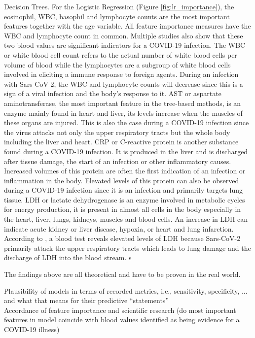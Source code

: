 Decision Trees. For the Logistic Regression (Figure \ref{fig:lr_importance}), 
the eosinophil, WBC, basophil and lymphocyte counts are the most important 
features together with the age variable. All feature importance measures have 
the WBC and lymphocyte count in common. Multiple studies also show that these 
two blood values are significant indicators for a COVID-19 infection. The WBC 
or white blood cell count refers to the actual number of white blood cells per 
volume of blood while the lymphocytes are a subgroup of white blood cells 
involved in eliciting a immune response to foreign agents.\cite{RN137, RN188} 
During an infection with Sars-CoV-2, the WBC and lymphocyte counts will 
decrease since this is a sign of a viral infection and the body's response to 
it.\cite{RN162,RN186, RN185}
AST or aspartate aminotransferase, the most important feature in the tree-based 
methods, is an enzyme mainly found in heart and liver, its levels increase when 
the muscles of these organs are injured.\cite{RN189, RN188} This is also the 
case during a COVID-19 infection since the virus attacks not only the upper 
respiratory tracts but the whole body including the liver and 
heart.\cite{RN182} CRP or C-reactive protein is another substance found during 
a COVID-19 infection. It is produced in the liver and is discharged after 
tissue damage, the start of an infection or other inflammatory causes. 
Increased volumes of this protein are often the first indication of an 
infection or inflammation in the body.\cite{RN138, RN188} Elevated levels of 
this protein can also be observed during a COVID-19 infection since it is an 
infection and primarily targets lung tissue.\cite{RN187, RN162} LDH or lactate 
dehydrogenase is an enzyme involved in metabolic cycles for energy production, 
it is present in almost all cells in the body especially in the heart, 
liver, lungs, kidneys, muscles and blood cells. An increase in LDH can indicate 
acute kidney or liver disease, hypoxia, or heart and lung 
infarction.\cite{RN190, RN188} According to \cite{RN162, RN187}, a blood test 
reveals elevated levels of LDH because Sars-CoV-2 primarily attack the upper 
respiratory tracts which leads to lung damage and the discharge of LDH into the 
blood stream. s
\par
The findings above are all theoretical and have to be proven in the real world.
\begin{changemargin}{50pt}{50pt}
 Plausibility of models in terms of recorded metrics, i.e., sensitivity, 
specificity, ... and what that means for their predictive ``statements''
\\
Accordance of feature importance and scientific research (do most important 
features in model coincide with blood values identified as being evidence for a 
COVID-19 illness)
\end{changemargin}
